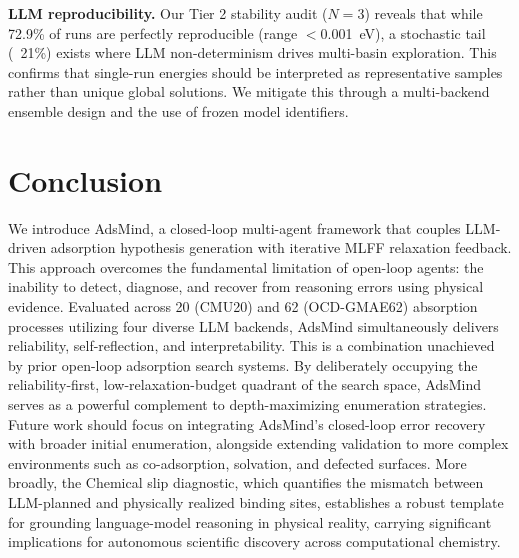 
\textbf{LLM reproducibility.} Our Tier 2 stability audit ($N=3$) reveals that while 72.9\% of runs are perfectly reproducible (range $<$0.001~eV), a stochastic tail (~21\%) exists where LLM non-determinism drives multi-basin exploration. This confirms that single-run energies should be interpreted as representative samples rather than unique global solutions. We mitigate this through a multi-backend ensemble design and the use of frozen model identifiers.


\section{Conclusion}

We introduce AdsMind, a closed-loop multi-agent framework that couples LLM-driven adsorption hypothesis generation with iterative MLFF relaxation feedback. This approach overcomes the fundamental limitation of open-loop agents: the inability to detect, diagnose, and recover from reasoning errors using physical evidence.
Evaluated across 20 (CMU20) and 62 (OCD-GMAE62) absorption processes utilizing four diverse LLM backends, AdsMind simultaneously delivers reliability, self-reflection, and interpretability. This is a combination unachieved by prior open-loop adsorption search systems. By deliberately occupying the reliability-first, low-relaxation-budget quadrant of the search space, AdsMind serves as a powerful complement to depth-maximizing enumeration strategies.
Future work should focus on integrating AdsMind's closed-loop error recovery with broader initial enumeration, alongside extending validation to more complex environments such as co-adsorption, solvation, and defected surfaces. More broadly, the Chemical slip diagnostic, which quantifies the mismatch between LLM-planned and physically realized binding sites, establishes a robust template for grounding language-model reasoning in physical reality, carrying significant implications for autonomous scientific discovery across computational chemistry.

